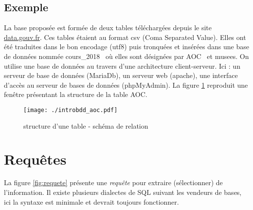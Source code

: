 \subsection{Exemple}
La base proposée est formée de deux tables téléchargées depuis le site \href{http://www.data.gouv.fr}{data.gouv.fr}.
Ces tables étaient au format csv (Coma Separated Value). Elles ont été traduites dans le bon encodage (utf8) puis tronquées et insérées dans une base de données nommée \og cours\_2018\fg~ où elles sont désignées par \og AOC\fg~ et \og musees\fg. \newline
On utilise une base de données au travers d'une architecture client-serveur. Ici : un serveur de base de données (MariaDb), un serveur web (apache), une interface d'accès au serveur de bases de données (phpMyAdmin).\newline
La figure \ref{fig:aoc} reproduit une fenêtre présentant la structure de la table \og AOC\fg.
\begin{figure}[h]
  \centering
  \texttt{[image: ./introbdd\_aoc.pdf]}
  \caption{structure d'une table - schéma de relation}
  \label{fig:aoc}
\end{figure}


\section{Requêtes}
La figure \ref{fig:requete} présente une \emph{requête} pour extraire (sélectionner) de l'information. Il existe plusieurs dialectes de SQL suivant les vendeurs de bases, ici la syntaxe est minimale et devrait toujours fonctionner.

